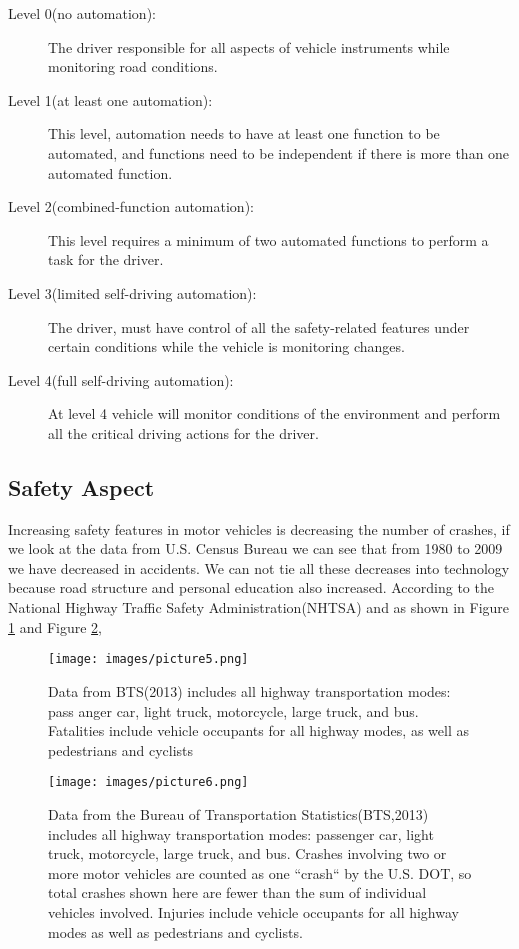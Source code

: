 \documentclass[sigconf]{acmart}
\begin{document}
\begin{description}
    \item[Level 0(no automation):] The driver responsible for all aspects of vehicle instruments while monitoring road con\-di\-ti\-ons\cite{hamzah}.
    \item[Level 1(at least one automation):] This level, automation needs to have at least one function to be automated, and functions need to be independent if there is more than one automated function\cite{hamzah}.
    \item[Level 2(combined-function automation):] This level re\-qu\-ir\-es a minimum of two automated functions to perform a task for the driver\cite{hamzah}.
    \item[Level 3(limited self-driving automation):] The driver, mu\-st have control of all the safety-related features under certain conditions while the vehicle is monitoring changes\cite{hamzah}.
    \item[Level 4(full self-driving automation):]At level 4 vehicle will monitor conditions of the environment and perform all the critical driving actions for the driver\cite{hamzah}.
\end{description}

\subsection{Safety Aspect}
Increasing safety features in motor vehicles is decreasing the number of crashes, if we look at the data from U.S. Census Bureau we can see that from 1980 to 2009 we have decreased in accidents. We can not tie all these decreases into technology because road structure and personal education also increased. According to the National Highway Traffic Safety Administration(NHTSA) and as shown in Figure \ref{fig:NHTSAaccidentreport} and Figure \ref{fig:NHTSAaccidentreport2}, 
 
 \begin{figure}[!ht]
  \centering
      \texttt{[image: images/picture5.png]}
  \caption{Data from BTS(2013) includes all highway transportation modes: pass anger car, light truck, motorcycle, large truck, and bus. Fatalities include vehicle occupants for all highway modes, as well as pedestrians and cyclists}\label{fig:NHTSAaccidentreport}
\end{figure}

 \begin{figure}[!ht]
  \centering
      \texttt{[image: images/picture6.png]}
  \caption{Data from the Bureau of Transportation Statistics(BTS,2013) includes all highway transportation modes: passenger car, light truck, motorcycle, large truck, and bus. Crashes involving two or more motor vehicles are counted as one ``crash`` by the U.S. DOT, so total crashes shown  here are fewer than the sum of individual vehicles involved. Injuries include vehicle occupants for all highway modes as well as pedestrians and cyclists.}\label{fig:NHTSAaccidentreport2}
\end{figure}
\end{document}
